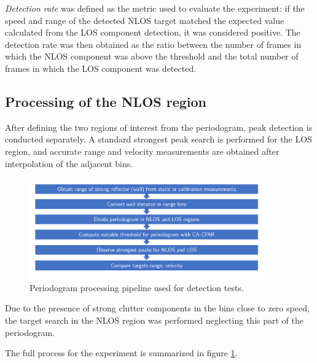 \textit{Detection rate} was defined as the metric used to evaluate the experiment: if the speed and range of the detected NLOS target matched the expected value calculated from the LOS component detection, it was considered positive.
The detection rate was then obtained as the ratio between the number of frames in which the NLOS component was above the threshold and the total number of frames in which the LOS component was detected.

\subsection{Processing of the NLOS region}

After defining the two regions of interest from the periodogram, peak detection is conducted separately. A standard strongest peak search is performed for the LOS region, and accurate range and velocity measurements are obtained after interpolation of the adjacent bins.

\begin{figure}[H]
	\centering
	\includegraphics[width=0.9\textwidth]{Images/Test1/NLOS-proc-pipeline.png}
	\caption{Periodogram processing pipeline used for detection tests.}
	\label{fig:Test1_NLOS-proc-pipeline}
\end{figure}


Due to the presence of strong clutter components in the bins close to zero speed, the target search in the NLOS region was performed neglecting this part of the periodogram.

The full process for the experiment is summarized in figure \ref{fig:Test1_NLOS-proc-pipeline}.

